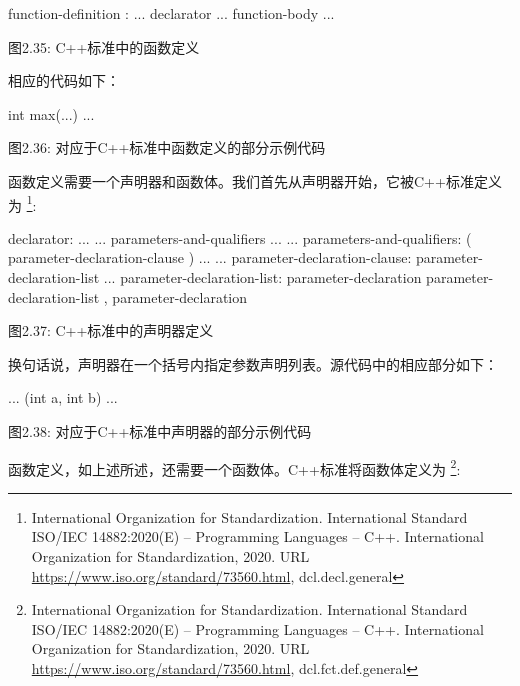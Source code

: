 \begin{shell}
function-definition :
    ... declarator ... function-body
    ...
\end{shell}

\begin{center}
图2.35: C++标准中的函数定义
\end{center}

相应的代码如下：

\begin{cpp}
int max(...) {
  ...
}
\end{cpp}

\begin{center}
图2.36: 对应于C++标准中函数定义的部分示例代码
\end{center}

函数定义需要一个声明器和函数体。我们首先从声明器开始，它被C++标准定义为 \footnote{International Organization for Standardization. International Standard ISO/IEC 14882:2020(E) – Programming Languages – C++. International Organization for Standardization, 2020. URL \url{https://www.iso.org/standard/73560.html}, dcl.decl.general}:

\begin{shell}
declarator:
        ...
        ... parameters-and-qualifiers ...
...
parameters-and-qualifiers:
        ( parameter-declaration-clause ) ...
...
parameter-declaration-clause:
        parameter-declaration-list ...
parameter-declaration-list:
        parameter-declaration
        parameter-declaration-list , parameter-declaration
\end{shell}

\begin{center}
图2.37: C++标准中的声明器定义
\end{center}

换句话说，声明器在一个括号内指定参数声明列表。源代码中的相应部分如下：

\begin{cpp}
... (int a, int b)
...
\end{cpp}

\begin{center}
图2.38: 对应于C++标准中声明器的部分示例代码
\end{center}

函数定义，如上述所述，还需要一个函数体。C++标准将函数体定义为 \footnote{International Organization for Standardization. International Standard ISO/IEC 14882:2020(E) – Programming Languages – C++. International Organization for Standardization, 2020. URL \url{https://www.iso.org/standard/73560.html}, dcl.fct.def.general}:

